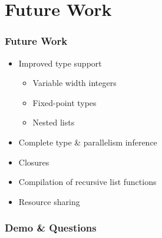 \documentclass{beamer}
\begin{document}
\section{Future Work}

\begin{frame}
    \frametitle{Future Work}
    \begin{itemize}
        \item Improved type support
            \begin{itemize}
                    \item Variable width integers
                    \item Fixed-point types
                    \item Nested lists
            \end{itemize}

        \item Complete type \& parallelism inference
        \item Closures
        \item Compilation of recursive list functions
        \item Resource sharing
    \end{itemize}
\end{frame}


\begin{frame}
    \frametitle{Demo \& Questions}
\end{frame}
\end{document}
